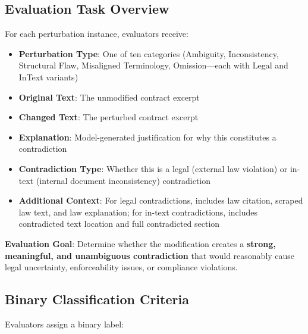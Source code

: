 \documentclass[11pt]{article}
\begin{document}
\subsection{Evaluation Task Overview}

For each perturbation instance, evaluators receive:
\begin{itemize}[leftmargin=*,itemsep=0.1em]
    \item \textbf{Perturbation Type}: One of ten categories (Ambiguity, Inconsistency, Structural Flaw, Misaligned Terminology, Omission—each with Legal and InText variants)
    \item \textbf{Original Text}: The unmodified contract excerpt
    \item \textbf{Changed Text}: The perturbed contract excerpt
    \item \textbf{Explanation}: Model-generated justification for why this constitutes a contradiction
    \item \textbf{Contradiction Type}: Whether this is a legal (external law violation) or in-text (internal document inconsistency) contradiction
    \item \textbf{Additional Context}: For legal contradictions, includes law citation, scraped law text, and law explanation; for in-text contradictions, includes contradicted text location and full contradicted section
\end{itemize}

\textbf{Evaluation Goal}: Determine whether the modification creates a \textbf{strong, meaningful, and unambiguous contradiction} that would reasonably cause legal uncertainty, enforceability issues, or compliance violations.

\subsection{Binary Classification Criteria}

Evaluators assign a binary label:
\end{document}
